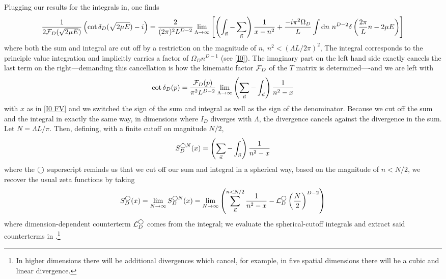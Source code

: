 Plugging our results for the integrals in, one finds
\begin{equation}
    \frac{1}{2\mathcal{F}_{D}(\sqrt{2\mu E})}\left(\cot \delta_{D}(\sqrt{2\mu E}) - i\right)
    =
    \frac{2}{(2\pi)^2 L^{D-2}}
    \lim\limits_{\Lambda \to \infty}
    \left[ 
    	\left(\int_{\vec{n}} - \sum_{\vec{n}}\right) \frac{1}{x-n^2} +
		\frac{-i \pi^2\Omega_D}{L} \int \mathrm{d}n\ n^{D-2} \delta\left(\frac{2\pi}{L}n - 2\mu E\right) 
	\right]
\end{equation}
where both the sum and integral are cut off by a restriction on the magnitude of $n$, $n^2 < (\Lambda L / 2\pi)^2$,
The integral corresponds to the principle value integration and implicitly carries a factor of $\Omega_D n^{D-1}$ (see \eqref{I0}).
The imaginary part on the left hand side exactly cancels the last term on the right---demanding this cancellation is how the kinematic factor $\mathcal{F}_D$ of the $T$ matrix is determined----and we are left with
\begin{equation}\label{eq:general luscher}
    \cot \delta_{D}(p)
    =
    \frac{\mathcal{F}_{D}(p)}{\pi^2 L^{D-2}}
    \lim\limits_{\Lambda \to \infty}\left(\sum_{\vec{n}}-\int_{\vec{n}}\right) \frac{1}{n^2-x}
\end{equation}
with $x$ as in \eqref{I0 FV} and we switched the sign of the sum and integral as well as the sign of the denominator.
Because we cut off the sum and the integral in exactly the same way, in dimensions where $I_D$ diverges with $\Lambda$, the divergence cancels against the divergence in the sum.
Let $N=\Lambda L/\pi$.
Then, defining, with a finite cutoff on magnitude $N/2$,
\begin{equation}\label{eq:spherical cutoff S}
    S^{\bigcirc N}_D(x) = \left(\sum_{\vec{n}}- \int_{\vec{n}}\right) \frac{1}{n^2-x}
\end{equation}
where the $\bigcirc$ superscript reminds us that we cut off our sum and integral in a spherical way, based on the magnitude of $n<N/2$, we recover the usual \Luscher zeta functions by taking
\begin{equation}\label{eq:spherical S}
    S^\bigcirc_D(x)
    =
    \lim_{N\rightarrow\infty} S^{\bigcirc N}_D(x)
    =
    \lim_{N\rightarrow\infty}\left( \sum_{\vec{n}}^{n < N/2} \frac{1}{n^2-x} - \mathcal{L}_D^\bigcirc \left(\frac{N}{2}\right)^{D-2}\right)
\end{equation}
where dimension-dependent counterterm $\mathcal{L}_D^\bigcirc$ comes from the integral; we evaluate the spherical-cutoff integrals and extract said counterterms in .\footnote{
In higher dimensions there will be additional divergences which cancel, for example, in five spatial dimensions there will be a cubic and linear divergence.
}
